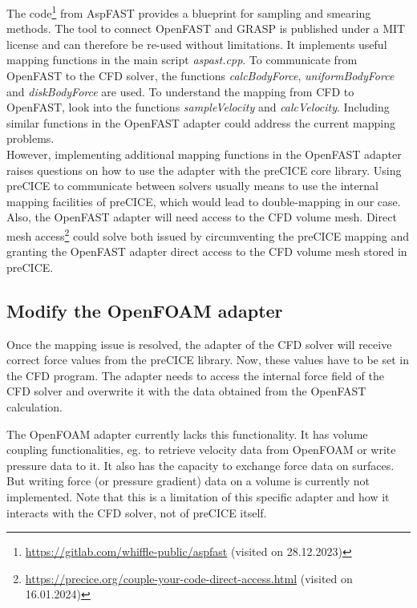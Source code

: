 The code\footnote{\url{https://gitlab.com/whiffle-public/aspfast} (visited on 28.12.2023)} from AspFAST provides a blueprint for sampling and smearing methods. The tool to connect OpenFAST and GRASP is published under a MIT license and can therefore be re-used without limitations. It implements useful mapping functions in the main script \textit{aspast.cpp}. To communicate from OpenFAST to the CFD solver, the functions \textit{calcBodyForce}, \textit{uniformBodyForce} and \textit{diskBodyForce} are used. To understand the mapping from CFD to OpenFAST, look into the functions \textit{sampleVelocity} and \textit{calcVelocity}. Including similar functions in the OpenFAST adapter could address the current mapping problems.\\

However, implementing additional mapping functions in the OpenFAST adapter raises questions on how to use the adapter with the preCICE core library. Using preCICE to communicate between solvers usually means to use the internal mapping facilities of preCICE, which would lead to double-mapping in our case. Also, the OpenFAST adapter will need access to the CFD volume mesh. Direct mesh access\footnote{\url{https://precice.org/couple-your-code-direct-access.html} (visited on 16.01.2024)} could solve both issued by circumventing the preCICE mapping and granting the OpenFAST adapter direct access to the CFD volume mesh stored in preCICE.

\subsection{Modify the OpenFOAM adapter}

Once the mapping issue is resolved, the adapter of the CFD solver will receive correct force values from the preCICE library. Now, these values have to be set in the CFD program. The adapter needs to access the internal force field of the CFD solver and overwrite it with the data obtained from the OpenFAST calculation.

The OpenFOAM adapter currently lacks this functionality. It has volume coupling functionalities, eg. to retrieve velocity data from OpenFOAM or write pressure data to it. It also has the capacity to exchange force data on surfaces. But writing force (or pressure gradient) data on a volume is currently not implemented. Note that this is a limitation of this specific adapter and how it interacts with the CFD solver, not of preCICE itself.\\

